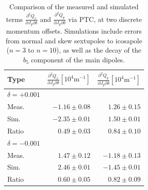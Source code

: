\begin{table}[H]
  \centering
  \begin{tabular}{lrr}
  \toprule
   Type  & $\frac{\partial^2 Q_x}{\partial J_y \partial \delta}[10^{4}\mathrm{m}^{-1}]$ & $\frac{\partial^2 Q_y}{\partial J_y \partial \delta}[10^{4}\mathrm{m}^{-1}]$ \\
  \midrule
  $\delta = +0.001$ & & \\
  \hspace{2mm}Meas.  &   $-1.16 \pm 0.08$ &  $1.26 \pm 0.15$  \\
  \hspace{2mm}Sim.   &   $-2.35 \pm 0.01$ &  $1.50 \pm 0.01$  \\
  \hspace{2mm}Ratio  &   $ 0.49 \pm 0.03$ &  $0.84 \pm 0.10$  \\
  $\delta = -0.001$ & & \\
  \hspace{2mm}Meas.  &  $1.47 \pm 0.12$  &   $-1.18 \pm 0.13$ \\
  \hspace{2mm}Sim.   &  $2.46 \pm 0.01$  &   $-1.45 \pm 0.01$ \\
  \hspace{2mm}Ratio  &  $0.60 \pm 0.05$  &   $ 0.82 \pm 0.09$ \\
  \bottomrule
  \end{tabular}
  \caption{Comparison of the measured and simulated terms $\frac{\partial^2 Q_x}{\partial J_y
  \partial \delta}$ and $\frac{\partial^2 Q_y}{\partial J_y \partial \delta}$ via PTC, at two
  discrete momentum offsets. Simulations include errors from normal and skew sextupoles to 
  icosapole ($n=3$ to $n=10$), as well as the decay of the $b_5$ component of the main dipoles.}
  \label{table:decapoles:decay:chromatic_ampdet}
\end{table}


